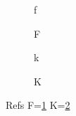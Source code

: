 \documentclass{article}
\begin{document}
\begin{figure}[h]
\begin{minipage}{.5\linewidth}\captionsetup{type=table}\centering f\caption{F}\label{F}\end{minipage}
\end{figure}
\begin{figure}[h]
\centering k\caption{K}\label{K}
\end{figure}
Refs F=\ref{F} K=\ref{K}
\end{document}
